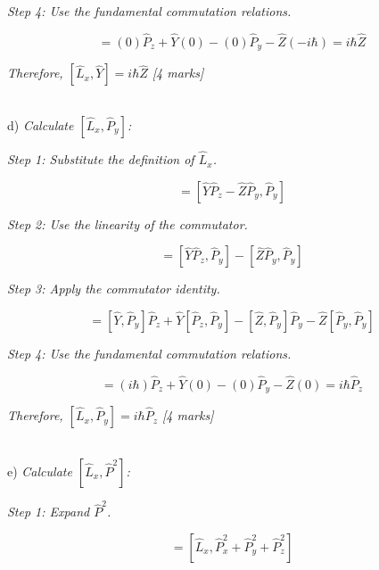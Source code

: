 \documentclass{article}
\begin{document}
\textit{Step 4: Use the fundamental commutation relations.}

\begin{equation}
[\hat{L}_x, \hat{Y}] = (0)\hat{P}_z + \hat{Y}(0) - (0)\hat{P}_y - \hat{Z}(-i\hbar) = i\hbar\hat{Z}
\end{equation}

\textit{Therefore, $[\hat{L}_x, \hat{Y}] = i\hbar \hat{Z}$ [4 marks]}

\\

d) \textit{Calculate $[\hat{L}_x, \hat{P}_y]$:}

\textit{Step 1: Substitute the definition of $\hat{L}_x$.}

\begin{equation}
[\hat{L}_x, \hat{P}_y] = [\hat{Y}\hat{P}_z - \hat{Z}\hat{P}_y, \hat{P}_y]
\end{equation}

\textit{Step 2: Use the linearity of the commutator.}

\begin{equation}
[\hat{L}_x, \hat{P}_y] = [\hat{Y}\hat{P}_z, \hat{P}_y] - [\hat{Z}\hat{P}_y, \hat{P}_y]
\end{equation}

\textit{Step 3: Apply the commutator identity.}

\begin{equation}
[\hat{L}_x, \hat{P}_y] = [\hat{Y}, \hat{P}_y]\hat{P}_z + \hat{Y}[\hat{P}_z, \hat{P}_y] - [\hat{Z}, \hat{P}_y]\hat{P}_y - \hat{Z}[\hat{P}_y, \hat{P}_y]
\end{equation}

\textit{Step 4: Use the fundamental commutation relations.}

\begin{equation}
[\hat{L}_x, \hat{P}_y] = (i\hbar)\hat{P}_z + \hat{Y}(0) - (0)\hat{P}_y - \hat{Z}(0) = i\hbar\hat{P}_z
\end{equation}

\textit{Therefore, $[\hat{L}_x, \hat{P}_y] = i\hbar \hat{P}_z$ [4 marks]}

\\

e) \textit{Calculate $[\hat{L}_x, \hat{P}^2]$:}

\textit{Step 1: Expand $\hat{P}^2$.}

\begin{equation}
[\hat{L}_x, \hat{P}^2] = [\hat{L}_x, \hat{P}_x^2 + \hat{P}_y^2 + \hat{P}_z^2]
\end{equation}
\end{document}
